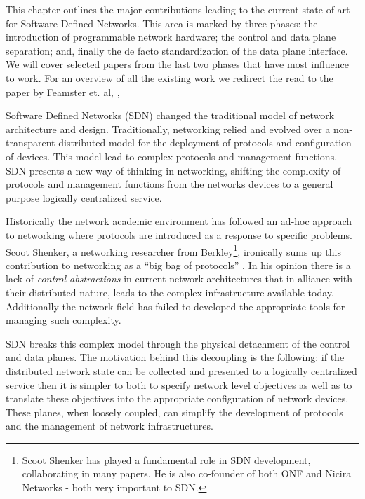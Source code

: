 

This chapter outlines the major contributions leading to the current state of art for Software Defined Networks. 
This area is marked by three phases: the introduction of programmable network hardware; the control and data plane separation; and, finally the de facto standardization of the data plane interface. 
We will cover selected papers from the last two phases that have most influence to work. 
For an overview of all the existing work we redirect the read to the paper by Feamster et. al, \cite{},  



Software Defined Networks (SDN) changed the traditional model of network architecture and design. 
Traditionally, networking  relied and evolved over a non-transparent distributed model for
the deployment  of  protocols and configuration of devices. 
This model lead to complex protocols and management functions. 
SDN presents a new way of thinking in networking, shifting the complexity of protocols and management functions from  the  networks devices to a general purpose logically centralized service. 

Historically  the network academic environment has followed an  ad-hoc approach to networking where protocols are introduced as a response to specific problems. 
Scoot Shenker, a networking researcher from Berkley\footnote{Scoot Shenker has played a fundamental role in SDN development, collaborating in many papers. He is also co-founder of both ONF \cite{onf} and Nicira Networks - both very important to SDN.}, ironically sums up  this contribution to networking as a ``big bag of protocols'' \cite{Shenker:2011ys}. 
In his opinion there is a lack of \emph{control abstractions} in current network architectures that in alliance  with  their  distributed nature, leads to the  complex infrastructure available today. 
Additionally the network field has failed to developed the appropriate tools for managing such complexity. 

SDN breaks this complex model through the physical detachment of the control and data planes.  
The motivation behind this decoupling is the following: if the distributed network state can be collected and presented to a logically centralized service then it is simpler to both to specify network level objectives as well as to translate these objectives into the appropriate configuration of network devices. 
These planes, when loosely coupled, can simplify the development of protocols and the management of network infrastructures. 


